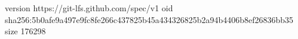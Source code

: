 version https://git-lfs.github.com/spec/v1
oid sha256:5b0afe9a497e9fc8fe266c437825b45a434326825b2a94b4406b8ef26836bb35
size 176298
